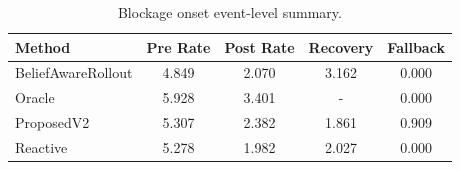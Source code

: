 \begin{table}[t]
\centering
\scriptsize
\setlength{\tabcolsep}{3pt}
\caption{Blockage onset event-level summary.}
\label{tab:event_summary}
\begin{tabular}{lcccc}
\toprule
Method & Pre Rate & Post Rate & Recovery & Fallback \\
\midrule
BeliefAwareRollout & 4.849 & 2.070 & 3.162 & 0.000 \\
Oracle & 5.928 & 3.401 & - & 0.000 \\
ProposedV2 & 5.307 & 2.382 & 1.861 & 0.909 \\
Reactive & 5.278 & 1.982 & 2.027 & 0.000 \\
\bottomrule
\end{tabular}
\end{table}
